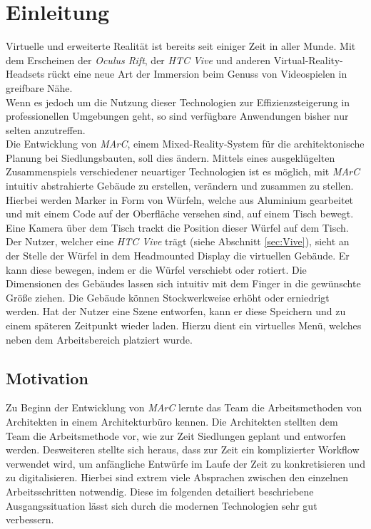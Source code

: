 \section{Einleitung}\label{sec:Einleitung}
Virtuelle und erweiterte Realität ist bereits seit einiger Zeit in aller Munde. Mit dem Erscheinen der \textit{Oculus Rift}, der \textit{HTC Vive} und anderen Virtual-Reality-Headsets rückt eine neue Art der Immersion beim Genuss von Videospielen in greifbare Nähe.\\
Wenn es jedoch um die Nutzung dieser Technologien zur Effizienzsteigerung in professionellen Umgebungen geht, so sind verfügbare Anwendungen bisher nur selten anzutreffen.\\
Die Entwicklung von \textit{MArC}, einem Mixed-Reality-System für die architektonische Planung bei Siedlungsbauten, soll dies ändern. Mittels eines ausgeklügelten Zusammenspiels verschiedener neuartiger Technologien ist es möglich, mit \textit{MArC} intuitiv abstrahierte Gebäude zu erstellen, verändern und zusammen zu stellen. \\
Hierbei werden Marker in Form von Würfeln, welche  aus Aluminium gearbeitet und mit einem Code auf der Oberfläche versehen sind, auf einem Tisch bewegt. Eine Kamera über dem Tisch trackt die Position dieser Würfel auf dem Tisch. Der Nutzer, welcher eine \textit{HTC Vive} trägt (siehe Abschnitt \ref{sec:Vive}), sieht an der Stelle der Würfel in dem Headmounted Display die virtuellen Gebäude. Er kann diese bewegen, indem er die Würfel verschiebt oder rotiert. Die Dimensionen des Gebäudes lassen sich intuitiv mit dem Finger in die gewünschte Größe ziehen. Die Gebäude können Stockwerkweise erhöht oder erniedrigt werden. Hat der Nutzer eine Szene entworfen, kann er diese Speichern und zu einem späteren Zeitpunkt wieder laden. Hierzu dient ein virtuelles Menü, welches neben dem Arbeitsbereich platziert wurde.

\subsection{Motivation}\label{sec:Motivation}
Zu Beginn der Entwicklung von \textit{MArC} lernte das Team die Arbeitsmethoden von Architekten in einem Architekturbüro kennen. Die Architekten stellten dem Team die Arbeitsmethode vor, wie zur Zeit Siedlungen geplant und entworfen werden. Desweiteren stellte sich heraus, dass zur Zeit ein komplizierter Workflow verwendet wird, um anfängliche Entwürfe im Laufe der Zeit zu konkretisieren und zu digitalisieren. Hierbei sind extrem viele Absprachen zwischen den einzelnen Arbeitsschritten notwendig. Diese im folgenden detailiert beschriebene Ausgangssituation lässt sich durch die modernen Technologien sehr gut verbessern.



